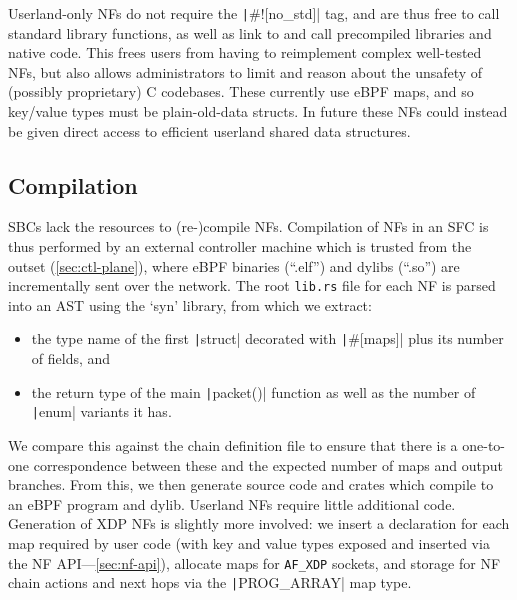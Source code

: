 \documentclass[comsoc, conference, times]{IEEEtran}
\newcommand{\afxdp}{\texttt{AF\_XDP}}
\begin{document}
Userland-only NFs do not require the \texttt|#![no_std]| tag, and are thus free to call standard library functions, as well as link to and call precompiled libraries and native code.
This frees users from having to reimplement complex well-tested NFs, but also allows administrators to limit and reason about the unsafety of (possibly proprietary) C codebases.
These currently use eBPF maps, and so key/value types must be plain-old-data structs.
In future these NFs could instead be given direct access to efficient userland shared data structures. %


\subsection{Compilation}\label{sec:compilation}
SBCs lack the resources to (re-)compile NFs. %
Compilation of NFs in an SFC is thus performed by an external controller machine which is trusted from the outset (\cref{sec:ctl-plane}), where eBPF binaries (``.elf'') and dylibs (``.so'') are incrementally sent over the network.
The root \texttt{lib.rs} file for each NF is parsed into an AST using the `syn' library, from which we extract:
\begin{itemize}
	\item the type name of the first \texttt|struct| decorated with \texttt|#[maps]| plus its number of fields, and
	\item the return type of the main \texttt|packet()| function as well as the number of \texttt|enum| variants it has.
\end{itemize}
We compare this against the chain definition file to ensure that there is a one-to-one correspondence between these and the expected number of maps and output branches.
From this, we then generate source code and crates which compile to an eBPF program and dylib.
Userland NFs require little additional code.
Generation of XDP NFs is slightly more involved: we insert a declaration for each map required by user code (with key and value types exposed and inserted via the NF API---\cref{sec:nf-api}), allocate maps for \afxdp{} sockets, and storage for NF chain actions and next hops via the \texttt|PROG_ARRAY| map type.
\end{document}
